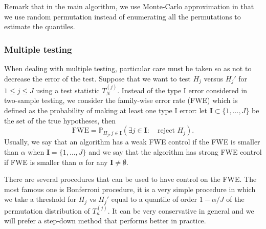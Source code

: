 \documentclass{article}
\theoremstyle{plain}
\theoremstyle{remark}
\renewcommand{\P}{\mathbb{P}}
\newcommand{\1}{\mathbbm{1}}
\numberwithin{equation}{section}
\begin{document}
Remark that in the main algorithm, we use Monte-Carlo approximation in that we use random permutation instead of enumerating all the permutations to estimate the quantiles.

\subsubsection{Multiple testing}
When dealing with multiple testing, particular care must be taken so as not to decrease the error of the test. Suppose that we want to test $H_j$ versus $H_j'$ for $1\le j\le J$ using a test statistic $T_{N}^{(j)}$. Instead of the type I error considered in two-sample testing, we consider the family-wise error rate (FWE) which is defined as the probability of making at least one type I error: let $\textbf{I}\subset \{1,\dots,J\}$ be the set of the true hypotheses, then 
$$\mathrm{FWE} = \P_{H_j, j \in \textbf{I}}\left(\exists j \in \textbf{I}:\quad  \text{reject }H_j \right).$$
Usually, we say that an algorithm has a weak FWE control if the FWE is smaller than $\alpha$ when $\textbf{I}=\{1,\dots,J\}$ and we say that the algorithm has strong FWE control if FWE is smaller than $\alpha$ for any $\textbf{I}\neq \emptyset$.

There are several procedures that can be used to have control on the FWE. The most famous one is Bonferroni procedure, it is a very simple procedure in which we take a threshold for $H_j$ vs $H_j'$ equal to a quantile of order $1-\alpha/J$ of the permutation distribution of $T_n^{(j)}$. It can be very conservative in general and we will prefer a step-down method that performs better in practice.
\end{document}
